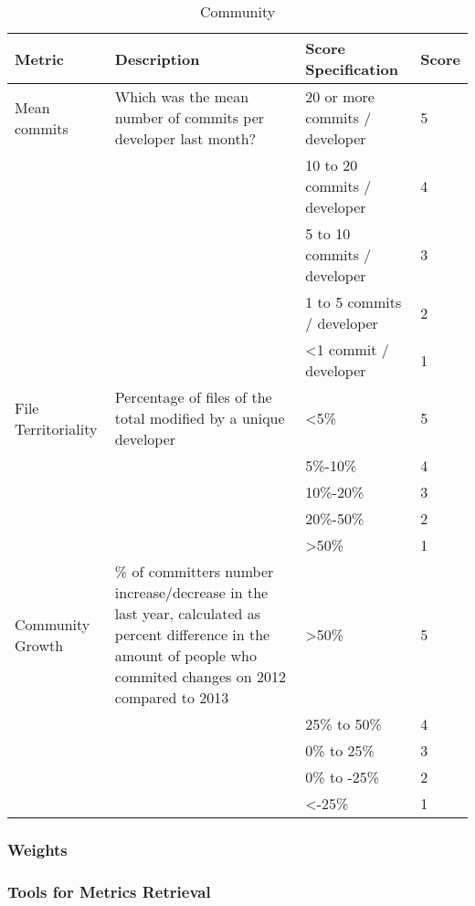 \documentclass[11pt]{article}
\begin{document}
\begin{table}[H]
  \begin{center}
    \begin{tabular}{ | p{3cm} | p{5cm} | p{3cm} | l | }
    \hline
    Metric & Description & Score Specification & Score \\
    \hline
    Mean commits & Which was the mean number of commits per developer last month? & 20 or more commits / developer & 5 \\ \cline{3-3} \cline{4-4}
    & & 10 to 20 commits / developer & 4 \\ \cline{3-3}\cline{4-4}
    & & 5 to 10 commits / developer & 3 \\ \cline{3-3}\cline{4-4}
    & & 1 to 5 commits / developer & 2 \\ \cline{3-3}\cline{4-4}
    & & \textless 1 commit / developer & 1 \\ 
    \hline
    File Territoriality & Percentage of files of the total modified by a unique developer & \textless 5\% & 5 \\ \cline{3-3} \cline{4-4}
    & & 5\%-10\%  & 4 \\ \cline{3-3}\cline{4-4}
    & & 10\%-20\% & 3 \\ \cline{3-3}\cline{4-4}
    & & 20\%-50\% & 2 \\ \cline{3-3}\cline{4-4}
    & & \textgreater 50\% & 1 \\ 
    \hline
    Community Growth & \% of committers number increase/decrease in the last year, calculated as percent difference in the amount of people who commited changes on 2012 compared to 2013 & \textgreater50\% & 5 \\ \cline{3-3} \cline{4-4}
    & & 25\% to 50\% & 4 \\ \cline{3-3}\cline{4-4}
    & & 0\% to 25\%  & 3 \\ \cline{3-3}\cline{4-4}
    & & 0\% to -25\% & 2 \\ \cline{3-3}\cline{4-4}
    & & \textless-25\%       & 1 \\ 
    \hline
    \end{tabular}
    \caption{Community}
    \label{tab:community}
  \end{center}
\end{table}

\subsubsection{Weights}

\subsubsection{Tools for Metrics Retrieval}
\end{document}
